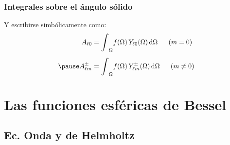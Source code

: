 \documentclass[12pt]{beamer}
\begin{document}
\begin{frame}
\frametitle{Integrales sobre el ángulo sólido}
Y escribirse simbólicamente como:
\pause
\begin{eqnarray*}
\begin{aligned}
A_{\ell 0} &= \scaleint{6ex}_{\Omega} f (\Omega) \, Y_{\ell 0} (\Omega) \dd{\Omega} \hspace{0.5cm} (m = 0) \\[0.5em] \pause
A_{\ell m}^{\pm} &= \scaleint{6ex}_{\Omega} f (\Omega) \, Y_{\ell m}^{\pm} (\Omega) \dd{\Omega} \hspace{0.5cm} (m \neq 0)
\end{aligned}
\end{eqnarray*}
\end{frame}

\section{Las funciones esféricas de Bessel}
\subsection{Ec. Onda y de Helmholtz}
\end{document}
